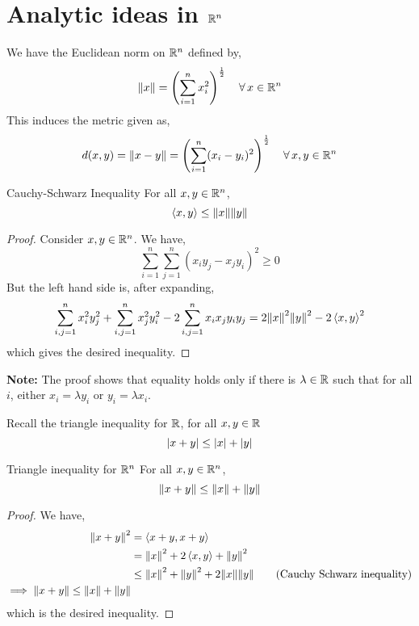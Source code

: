 \documentclass[../Analysis-3]{subfiles}
\begin{document}
\section{Analytic ideas in $ \mathbb{R}^n $}

We have the Euclidean norm on $ \mathbb{R}^n $ defined by,
\[ \norm{x} = \left(\sum_{i=1}^{n}x_i^2\right)^{\frac 12} \quad \forall \, x \in \mathbb{R}^n \]
This induces the metric given as,
\[ d(x,y) = \norm{x-y} = \left(\sum_{i=1}^{n}(x_i-y_i)^2\right)^{\frac 12} \quad \forall \, x,y \in \mathbb{R}^n \]

\begin{Thm}{Cauchy-Schwarz Inequality}{}
      For all $ x,y \in \mathbb{R}^n $, \[ \left\langle {x}, {y} \right\rangle \leq \norm{x} \norm{y} \]
\end{Thm}
\begin{proof}
      Consider $ x,y \in \mathbb{R}^n $. We have,
      \[ \sum_{i=1}^{n}\sum_{j=1}^{n} (x_iy_j - x_jy_i)^2 \geq 0 \]
      But the left hand side is, after expanding,
      \[ \sum_{i,j = 1}^{n} x_i^2y_j^2 + \sum_{i,j = 1}^{n} x_j^2y_i^2 - 2 \sum_{i,j=1}^{n} x_ix_j y_iy_j = 2 \norm{x}^2\norm{y}^2 - 2\left\langle {x}, {y} \right\rangle^2 \]
      which gives the desired inequality.
\end{proof}

\textbf{Note:} The proof shows that equality holds only if there is $ \lambda \in \mathbb{R} $ such that for all $ i $, either $ x_i = \lambda y_i $ or $ y_i = \lambda x_i $.
\msk

Recall the triangle inequality for $ \mathbb{R} $, for all $ x,y \in \mathbb{R} $
\[ \abs{x+y} \leq \abs{x} + \abs{y} \]

\begin{Thm}{Triangle inequality for $ \mathbb{R}^n $}{}
      For all $ x,y \in \mathbb{R}^n $,
      \[ \norm{x+y} \leq \norm{x} + \norm{y} \]
\end{Thm}
\begin{proof}
      We have,
      \begin{align*}
            \norm{x+y}^2 & = \left\langle {x+y}, {x+y} \right\rangle                                                                 \\
                         & = \norm{x}^2 + 2\left\langle {x}, {y} \right\rangle + \norm{y}^2                                             \\
                         & \leq \norm{x}^2 + \norm{y}^2 +2 \norm{x}\norm{y} \tag{Cauchy Schwarz inequality} \\
            \implies \norm{x+y} \leq \norm{x} + \norm{y}
      \end{align*}
      which is the desired inequality.
\end{proof}
\msk
\end{document}
